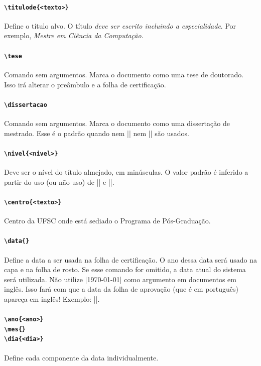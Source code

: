 \documentclass[embeddedlogo]{../ufsc-thesis-rn46-2019}
\begin{document}
\paragraph*{\texttt{\textbackslash{}titulode\{<texto>\}}} Define o título alvo.
O título \textit{deve ser escrito incluindo a especialidade}. Por exemplo,
\emph{Mestre em Ciência da Computação}.

\paragraph*{\texttt{\textbackslash{}tese}} Comando sem argumentos. Marca o
documento como uma tese de doutorado. Isso irá alterar o preâmbulo e a folha de
certificação.

\paragraph*{\texttt{\textbackslash{}dissertacao}} Comando sem argumentos. Marca
o documento como uma dissertação de mestrado. Esse é o padrão quando nem
\mt|\dissertacao| nem \mt|\tese| são usados.

\paragraph*{\texttt{\textbackslash{}nivel\{<nivel>\}}} Deve ser o nível do
título almejado, em minúsculas. O valor padrão é inferido a partir do uso (ou
não uso) de \mt|\tese| e \mt|\dissertacao|.

\paragraph*{\texttt{\textbackslash{}centro\{<texto>\}}} Centro da UFSC onde
está sediado o Programa de Pós-Graduação.

\paragraph*{\texttt{\textbackslash{}data\{<data por extenso>\}}} Define a data
a ser usada na folha de certificação. O ano dessa data será usado na capa e na
folha de rosto. Se esse comando for omitido, a data atual do sistema será
utilizada. Não utilize \mt|\today| como argumento em documentos em inglês. Isso
fará com que a data da folha de aprovação (que é em português) apareça em
inglês! Exemplo: \mt||.

\paragraph*{\texttt{\textbackslash{}ano\{<ano>\}} \\
            \texttt{\textbackslash{}mes\{<nome do mes>\}} \\
            \texttt{\textbackslash{}dia\{<dia>\}}}
Define cada componente da data individualmente.
\end{document}
